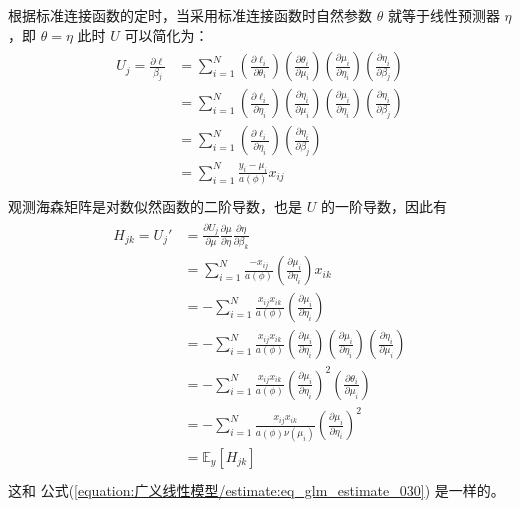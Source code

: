 \documentclass[letterpaper,10pt,english]{sphinxmanual}
\begin{document}
根据标准连接函数的定时，当采用标准连接函数时自然参数 \(\theta\) 就等于线性预测器
\(\eta\)，即 \(\theta=\eta\)
此时 \(U\) 可以简化为：
\begin{align}\label{equation:广义线性模型/estimate:eq_glm_estimate_score_3}\!\begin{aligned}
U_j=\frac{ \partial \ell}{\beta_j}
&= \sum_{i=1}^N \left ( \frac{\partial \ell_i}{\partial \theta_i} \right )
 \left ( \frac{\partial \theta_i}{\partial \mu_i} \right )
 \left ( \frac{\partial \mu_i}{\partial \eta_i} \right )
 \left ( \frac{\partial \eta_i}{\partial \beta_j} \right )\\
&= \sum_{i=1}^N \left ( \frac{\partial \ell_i}{\partial \eta_i} \right )
   \left ( \frac{\partial \eta_i}{\partial \mu_i} \right )
   \left ( \frac{\partial \mu_i}{\partial \eta_i} \right )
   \left ( \frac{\partial \eta_i}{\partial \beta_j} \right )\\
&= \sum_{i=1}^N \left ( \frac{\partial \ell_i}{\partial \eta_i} \right )
   \left ( \frac{\partial \eta_i}{\partial \beta_j} \right )\\
&= \sum_{i=1}^N \frac{y_i-\mu_i}{a(\phi) } x_{ij}\\
\end{aligned}\end{align}
观测海森矩阵是对数似然函数的二阶导数，也是 \(U\) 的一阶导数，因此有
\begin{align}\label{equation:广义线性模型/estimate:广义线性模型/estimate:29}\!\begin{aligned}
H_{jk} = U_j' &=  \frac{\partial U_j}{\partial \mu}
   \frac{\partial \mu}{\partial \eta} \frac{\partial \eta}{\partial \beta_k}\\
&= \sum_{i=1}^N  \frac{-x_{ij}}{a(\phi)} \left ( \frac{\partial \mu_i}{\partial \eta_i} \right )  x_{ik}\\
&= -\sum_{i=1}^N  \frac{x_{ij}x_{ik}}{a(\phi)} \left ( \frac{\partial \mu_i}{\partial \eta_i} \right )\\
&= -\sum_{i=1}^N  \frac{x_{ij}x_{ik}}{a(\phi)}
 \left ( \frac{\partial \mu_i}{\partial \eta_i} \right )
 \left ( \frac{\partial \mu_i}{\partial \eta_i} \right )
 \left ( \frac{\partial \eta_i}{\partial \mu_i} \right )\\
&= -\sum_{i=1}^N  \frac{x_{ij}x_{ik}}{a(\phi)}
 \left ( \frac{\partial \mu_i}{\partial \eta_i} \right )^2
 \left ( \frac{\partial \theta_i}{\partial \mu_i} \right )\\
&= -\sum_{i=1}^N  \frac{x_{ij}x_{ik}}{a(\phi)\nu(\mu_i)}
 \left ( \frac{\partial \mu_i}{\partial \eta_i} \right )^2\\
&= \mathbb{E}_y [H_{jk}]\\
\end{aligned}\end{align}
这和 公式(\ref{equation:广义线性模型/estimate:eq_glm_estimate_030}) 是一样的。
\end{document}
